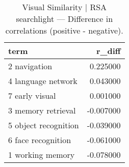 \begin{table}
\caption{Visual Similarity | RSA searchlight — Difference in correlations (positive - negative).}
\label{tab:Visual Similarity | RSA searchlight_diff}
\begin{tabular}{lr}
\toprule
term & r\_diff \\
\midrule
2 navigation & 0.225000 \\
4 language network & 0.043000 \\
7 early visual & 0.001000 \\
3 memory retrieval & -0.007000 \\
5 object recognition & -0.039000 \\
6 face recognition & -0.061000 \\
1 working memory & -0.078000 \\
\bottomrule
\end{tabular}
\end{table}
